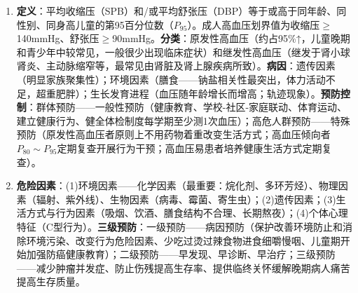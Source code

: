 \begin{enumerate}[leftmargin=*, itemsep=5pt]
    \item \textbf{定义}：平均收缩压（SPB）和/或平均舒张压（DBP）等于或高于同年龄、同性别、同身高儿童的第95百分位数（$P_{95}$）。成人高血压划界值为收缩压$\geq$140mmHg、舒张压$\geq$90mmHg。\textbf{分类}：原发性高血压（约占95\%↑，儿童晚期和青少年中较常见，一般很少出现临床症状）和继发性高血压（继发于肾小球肾炎、主动脉缩窄等，最常见由肾脏及肾上腺疾病所致）。\textbf{病因}：遗传因素（明显家族聚集性）；环境因素（膳食——钠盐相关性最突出，体力活动不足，超重肥胖）；生长发育进程（血压随年龄增长而增高；轨迹现象）。\textbf{预防控制}：群体预防——一般性预防（健康教育、学校-社区-家庭联动、体育运动、建立健康行为、健全体检制度每学期至少测1次血压）；高危人群预防——特殊预防（原发性高血压者原则上不用药物着重改变生活方式；高血压倾向者$P_{80}\sim P_{95}$定期复查开展行为干预；高血压易患者培养健康生活方式定期复查）。

    \item \textbf{危险因素}：(1)环境因素——化学因素（最重要：烷化剂、多环芳烃）、物理因素（辐射、紫外线）、生物因素（病毒、霉菌、寄生虫）；(2)遗传因素；(3)生活方式与行为因素（吸烟、饮酒、膳食结构不合理、长期熬夜）；(4)个体心理特征（C型行为）。\textbf{三级预防}：一级预防——病因预防（保护改善环境防止和消除环境污染、改变行为危险因素、少吃过烫过辣食物进食细嚼慢咽、儿童期开始加强防癌健康教育）；二级预防——早发现、早诊断、早治疗；三级预防——减少肿瘤并发症、防止伤残提高生存率、提供临终关怀缓解晚期病人痛苦提高生存质量。
\end{enumerate}

\newpage

